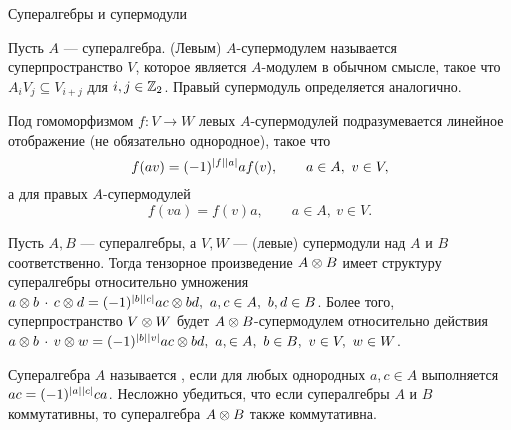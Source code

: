 \begin{subsection}{Супералгебры и супермодули}
  \begin{definition}
    Пусть $ A $ --- супералгебра. (Левым) $A$-супермодулем называется
    суперпространство $ V $, которое является $ A $-модулем в обычном смысле,
    такое что $ A_i V_j \subseteq V_{i+j} $ для $ i, j \in \mathbb{Z}_2 $.
    Правый супермодуль определяется аналогично.
  \end{definition}
  Под гомоморфизмом $ f: V \to W $ левых $A$-супермодулей подразумевается
  линейное отображение (не обязательно однородное), такое что
  $$ f(av) = \sgn{f}{a} a f(v), \qquad a \in A, ~v \in V, $$
  а для правых $A$-супермодулей
  $$ f(va) = f(v) a, \qquad a \in A, ~v \in V. $$

  Пусть $ A, B $ --- супералгебры, а $ V, W $ --- (левые) супермодули над
  $ A $ и $ B $ соответственно. Тогда тензорное произведение $ A \otimes B $ имеет
  структуру супералгебры относительно умножения
  $ a \o b \,\cdot \,c \o d = \sgn{b}{c} ac \o bd, ~a,c \in A, ~b,d \in B $.
  Более того, суперпространство $ V \otimes W $ будет
  $ A \otimes B $-супермодулем относительно действия
  $ a \o b \,\cdot \,v \o w = \sgn{b}{v} ac \o bd, ~a, \in A, ~b \in B, ~v \in V, ~w \in W $.

  Супералгебра $ A $ называется , если для любых однородных
  $ a, c \in A $ выполняется $ ac = \sgn{a}{c} ca $. Несложно убедиться, что
  если супералгебры $ A $ и $ B $ коммутативны, то супералгебра $ A \otimes B $ также
  коммутативна.
\end{subsection}

